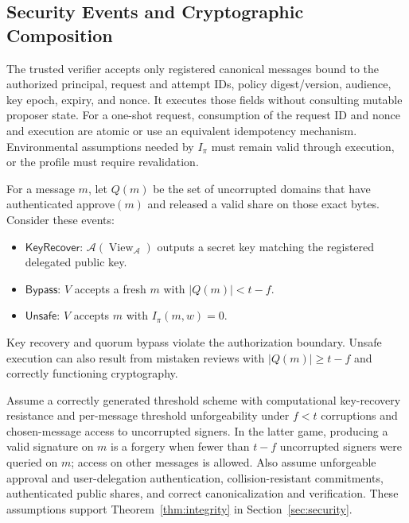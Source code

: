 \documentclass{article}
\begin{document}
\subsection{Security Events and Cryptographic Composition}

The trusted verifier accepts only registered canonical messages bound to the
authorized principal, request and attempt IDs, policy digest/version, audience,
key epoch, expiry, and nonce.
It executes those fields without consulting mutable proposer state.
For a one-shot request, consumption of the request ID and nonce and execution
are atomic or use an equivalent idempotency mechanism. Environmental assumptions needed by $I_\pi$ must remain valid through
execution, or the profile must require revalidation.

For a message $m$, let $Q(m)$ be the set of uncorrupted domains that have
authenticated approve$(m)$ and released a valid share on those exact bytes.
Consider these events:
\begin{itemize}[leftmargin=1.5em,itemsep=2pt,topsep=2pt]
 \item $\mathsf{KeyRecover}$: $\mathcal A(\operatorname{View}_{\mathcal A})$
 outputs a secret key matching the registered delegated public key.
 \item $\mathsf{Bypass}$: $V$ accepts a fresh $m$ with $|Q(m)|<t-f$.
 \item $\mathsf{Unsafe}$: $V$ accepts $m$ with $I_\pi(m,w)=0$.
\end{itemize}
Key recovery and quorum bypass violate the authorization boundary.
Unsafe execution can also result from mistaken reviews with $|Q(m)|\ge t-f$
and correctly functioning cryptography.

Assume a correctly generated threshold scheme with computational key-recovery
resistance and per-message threshold unforgeability under $f<t$ corruptions
and chosen-message access to uncorrupted signers. In the latter game, producing
a valid signature on $m$ is a forgery when fewer than $t-f$ uncorrupted signers
were queried on $m$; access on other messages is allowed.
Also assume unforgeable approval and user-delegation authentication,
collision-resistant commitments, authenticated public shares, and correct
canonicalization and verification. These assumptions support Theorem~\ref{thm:integrity} in
Section~\ref{sec:security}.
\end{document}
